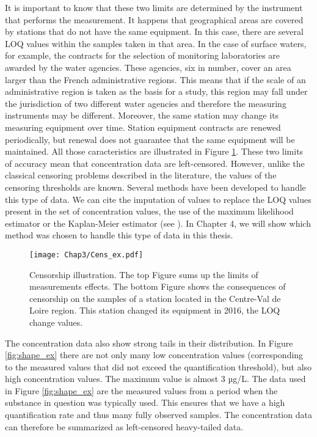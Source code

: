 It is important to know that these two limits are determined by the instrument that performs the measurement. It happens that geographical areas are covered by stations that do not have the same equipment. In this case, there are several LOQ values within the samples taken in that area. In the case of surface waters, for example, the contracts for the selection of monitoring laboratories are awarded by the water agencies. These agencies, six in number, cover an area larger than the French administrative regions. This means that if the scale of an administrative region is taken as the basis for a study, this region may fall under the jurisdiction of two different water agencies and therefore the measuring instruments may be different. Moreover, the same station may change its measuring equipment over time. Station equipment contracts are renewed periodically, but renewal does not guarantee that the same equipment will be maintained. All those caracteristics are illustrated in Figure \ref{fig:cens_ex}. These two limits of accuracy mean that concentration data are left-censored. However, unlike the classical censoring problems described in the literature, the values of the censoring thresholds are known. Several methods have been developed to handle this type of data. We can cite the imputation of values to replace the LOQ values present in the set of concentration values, the use of the maximum likelihood estimator or the Kaplan-Meier estimator (see \cite{Gillaizeau2020,Croghan2003MethodsOD}). In Chapter 4, we will show which method was chosen to handle this type of data in this thesis. 

\begin{figure}
    \centering
    \texttt{[image: Chap3/Cens\_ex.pdf]}
    \caption{Censorship illustration. The top Figure sums up the limits of measurements effects. The bottom Figure shows the consequences of censorship on the samples of a station located in the Centre-Val de Loire region. This station changed its equipment in 2016, the LOQ change values.}
    \label{fig:cens_ex}
\end{figure}

The concentration data also show strong tails in their distribution. In Figure \ref{fig:shape_ex} there are not only many low concentration values (corresponding to the measured values that did not exceed the quantification threshold), but also high concentration values. The maximum value is almost 3 µg/L. The data used in Figure \ref{fig:shape_ex} are the measured values from a period when the substance in question was typically used. This ensures that we have a high quantification rate and thus many fully observed samples. The concentration data can therefore be summarized as left-censored heavy-tailed data.

